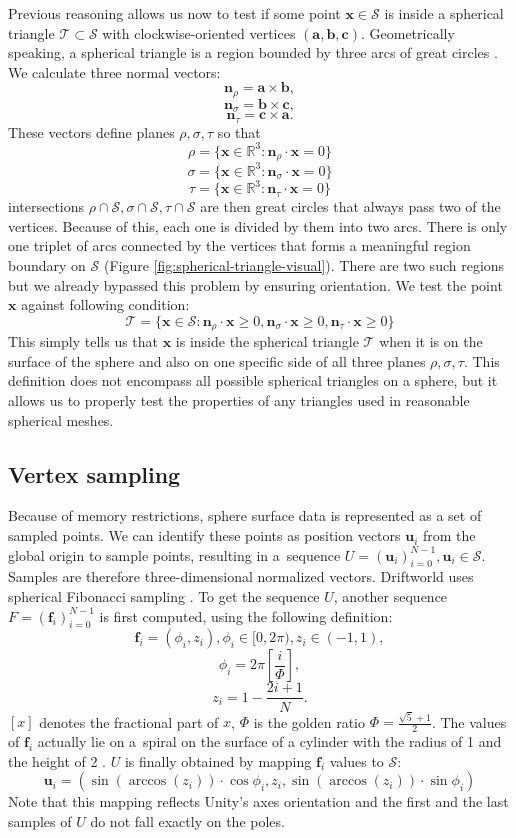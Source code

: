 Previous reasoning allows us now to test if some point $\mathbf{x}\in\mathcal{S}$ is inside a spherical triangle $\mathcal{T}\subset\mathcal{S}$ with clockwise-oriented vertices $(\mathbf{a}, \mathbf{b}, \mathbf{c})$.
Geometrically speaking, a spherical triangle is a region bounded by three arcs of great circles \cite{palmer}. We calculate three normal vectors:
$$\mathbf{n}_{\rho}=\mathbf{a}\times\mathbf{b},$$
$$\mathbf{n}_{\sigma}=\mathbf{b}\times\mathbf{c},$$
$$\mathbf{n}_{\tau}=\mathbf{c}\times\mathbf{a}.$$
These vectors define planes $\rho, \sigma, \tau$ so that
$$\rho=\{\mathbf{x}\in\mathbb{R}^3:\mathbf{n}_{\rho}\cdot\mathbf{x}=0\}$$
$$\sigma=\{\mathbf{x}\in\mathbb{R}^3:\mathbf{n}_{\sigma}\cdot\mathbf{x}=0\}$$
$$\tau=\{\mathbf{x}\in\mathbb{R}^3:\mathbf{n}_{\tau}\cdot\mathbf{x}=0\}$$
intersections $\rho\cap\mathcal{S}, \sigma\cap\mathcal{S}, \tau\cap\mathcal{S}$ are then great circles that always pass two of the vertices. Because of this, each one is divided by them into two arcs. There is only one triplet of arcs connected by the vertices that forms a meaningful region boundary on $\mathcal{S}$ (Figure \ref{fig:spherical-triangle-visual}). There are two such regions but we already bypassed this problem by ensuring orientation. We test the point $\mathbf{x}$ against following condition:
$$\mathcal{T}=\{\mathbf{x}\in\mathcal{S}:\mathbf{n}_{\rho}\cdot\mathbf{x}\ge 0, \mathbf{n}_{\sigma}\cdot\mathbf{x}\ge 0, \mathbf{n}_{\tau}\cdot\mathbf{x}\ge 0\}$$
This simply tells us that $\mathbf{x}$ is inside the spherical triangle $\mathcal{T}$ when it is on the surface of the sphere and also on one specific side of all three planes $\rho, \sigma, \tau$. This definition does not encompass all possible spherical triangles on a sphere, but it allows us to properly test the properties of any triangles used in reasonable spherical meshes.
\subsection{Vertex sampling}
Because of memory restrictions, sphere surface data is represented as a set of sampled points. We can identify these points as position vectors $\mathbf{u}_i$ from the global origin to sample points, resulting in a~sequence $U=\left(\mathbf{u}_i\right)_{i=0}^{N-1}, \mathbf{u}_i \in \mathcal{S}$. Samples are therefore three-dimensional normalized vectors. Driftworld uses spherical Fibonacci sampling \cite{keinert}. To get the sequence $U$, another sequence $F=\left(\mathbf{f}_i\right)_{i=0}^{N-1}$ is first computed, using the following definition:
$$\mathbf{f}_i=(\phi_i, z_i), \phi_i \in [0,2\pi), z_i \in (-1,1),$$
$$\phi_i = 2\pi\left[\frac{i}{\Phi}\right],$$
$$z_i = 1-\frac{2i+1}{N}.$$
$\left[x\right]$ denotes the fractional part of $x$, $\Phi$ is the golden ratio $\Phi=\frac{\sqrt{5}+1}{2}$. The values of $\mathbf{f}_i$ actually lie on a~spiral on the surface of a cylinder with the radius of 1 and the height of 2 \cite{keinert}. $U$ is finally obtained by mapping $\mathbf{f}_i$ values to $\mathcal{S}$:
$$\mathbf{u}_i = (\sin{(\arccos{(z_i)})}\cdot\cos{\phi_i}, z_i, \sin{(\arccos{(z_i)})}\cdot\sin{\phi_i})$$
Note that this mapping reflects Unity's axes orientation and the first and the last samples of $U$ do not fall exactly on the poles.
